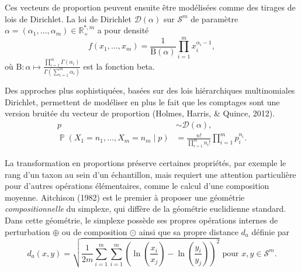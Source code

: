 \documentclass[12pt,a4paper]{reedthesis}
\newcommand \RR {\mathbb{R}}
\DeclareMathOperator*{\prob}{\mathbb{P}}
\newcommand \PP [1]{\prob\left({#1}\right)}
\theoremstyle{definition}
\theoremstyle{definition}
\theoremstyle{definition}
\theoremstyle{remark}
\begin{document}
Ces vecteurs de proportion peuvent ensuite être modélisées comme des tirages de lois de Dirichlet. La loi de Dirichlet \(\mathcal{D}(\alpha)\) sur \(\mathcal{S}^m\) de paramètre \(\alpha = (\alpha_1, \ldots, \alpha_m) \in \RR_+^{*,m}\) a pour densité
\begin{equation*}
f(x_1, \ldots, x_m) = \frac{1}{\text{B}(\alpha)} \prod_{i=1}^m x_i^{\alpha_i-1},
\end{equation*}
où \(\text{B} : \alpha \mapsto \frac{\prod_{i=1}^m\Gamma(\alpha_i)}{\Gamma\left(\sum_{i=1}^m \alpha_i\right)}\) est la fonction beta.

Des approches plus sophistiquées, basées sur des lois hiérarchiques multinomiales Dirichlet, permettent de modéliser en plus le fait que les comptages sont une version bruitée du vecteur de proportion (Holmes, Harris, \& Quince, 2012).
\begin{equation*}
\begin{aligned}
p & \sim \mathcal{D}(\alpha), \\
\PP{X_1 = n_1, \ldots, X_m = n_m\mid p} & = \frac{n!}{\prod_{i=1}^m n_i!}\prod_{i=1}^m p_i^{n_i}.
\end{aligned}
\end{equation*}
\newline

La transformation en proportions préserve certaines propriétés, par exemple le rang d'un taxon au sein d'un échantillon, mais requiert une attention particulière pour d'autres opérations élémentaires, comme le calcul d'une composition moyenne. Aitchison (1982) est le premier à proposer une géométrie \emph{compositionnelle} du simplexe, qui diffère de la géométrie euclidienne standard. Dans cette géométrie, le simplexe possède ses propres opérations internes de perturbation \(\oplus\) ou de composition \(\odot\) ainsi que sa propre distance \(d_a\) définie par
\begin{equation*}
d_a(x, y) = \sqrt{\frac{1}{2m}\sum_{i=1}^m\sum_{i=1}^m\left(\ln\left(\frac{x_i}{x_j}\right)-\ln\left(\frac{y_i}{y_j}\right)\right)^2} \text{ pour } x,y\in\mathcal{S}^m.
\end{equation*}
\newline
\end{document}
